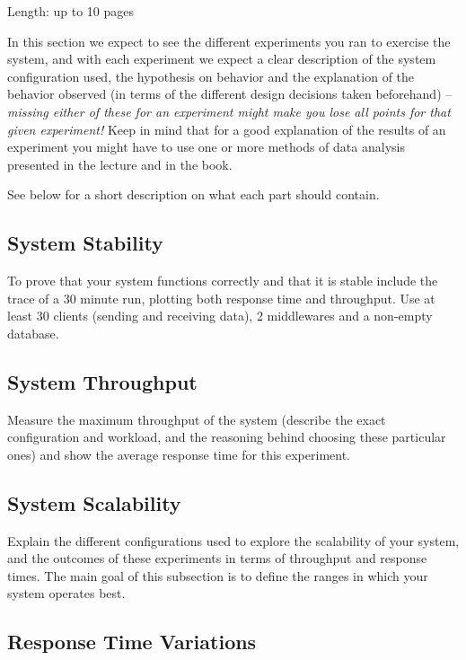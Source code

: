 \documentclass[11pt]{article}
\begin{document}
Length: up to 10 pages

In this section we expect to see the different experiments you ran to
exercise the system, and with each experiment we expect a clear
description of the system configuration used, the hypothesis on behavior
and the explanation of the behavior observed (in terms of the different
design decisions taken beforehand) -- \emph{missing either of these for
an experiment might make you lose all points for that given experiment!}
Keep in mind that for a good explanation of the results of an experiment
you might have to use one or more methods of data analysis presented in
the lecture and in the book.

See below for a short description on what each part should contain.

\subsection{System Stability}\label{sec:system-stability}

To prove that your system functions correctly and that it is stable
include the trace of a 30 minute run, plotting both response time and
throughput. Use at least 30 clients (sending and receiving data), 2
middlewares and a non-empty database.

\subsection{System Throughput}\label{sec:system-throughput}

Measure the maximum throughput of the system (describe the exact
configuration and workload, and the reasoning behind choosing these
particular ones) and show the average response time for this experiment.

\subsection{System Scalability}\label{sec:system-scalability}

Explain the different configurations used to explore the scalability of
your system, and the outcomes of these experiments in terms of
throughput and response times. The main goal of this subsection is to
define the ranges in which your system operates best.

\subsection{Response Time Variations}\label{sec:response-time-variations}
\end{document}
